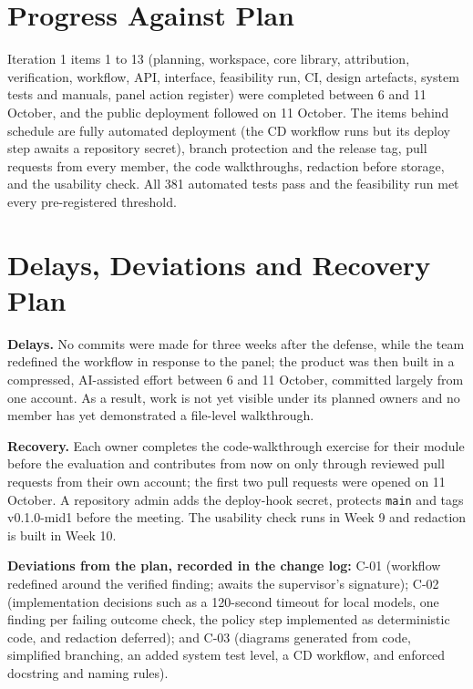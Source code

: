 \documentclass{fast-nuces-bs}
\begin{document}
\section{Progress Against Plan}

Iteration 1 items 1 to 13 (planning, workspace, core library, attribution, verification, workflow, API, interface, feasibility run, CI, design artefacts, system tests and manuals, panel action register) were completed between 6 and 11 October, and the public deployment followed on 11 October. The items behind schedule are fully automated deployment (the CD workflow runs but its deploy step awaits a repository secret), branch protection and the release tag, pull requests from every member, the code walkthroughs, redaction before storage, and the usability check. All 381 automated tests pass and the feasibility run met every pre-registered threshold.

\section{Delays, Deviations and Recovery Plan}

\textbf{Delays.} No commits were made for three weeks after the defense, while the team redefined the workflow in response to the panel; the product was then built in a compressed, AI-assisted effort between 6 and 11 October, committed largely from one account. As a result, work is not yet visible under its planned owners and no member has yet demonstrated a file-level walkthrough.

\textbf{Recovery.} Each owner completes the code-walkthrough exercise for their module before the evaluation and contributes from now on only through reviewed pull requests from their own account; the first two pull requests were opened on 11 October. A repository admin adds the deploy-hook secret, protects \texttt{main} and tags v0.1.0-mid1 before the meeting. The usability check runs in Week 9 and redaction is built in Week 10.

\textbf{Deviations from the plan, recorded in the change log:} C-01 (workflow redefined around the verified finding; awaits the supervisor's signature); C-02 (implementation decisions such as a 120-second timeout for local models, one finding per failing outcome check, the policy step implemented as deterministic code, and redaction deferred); and C-03 (diagrams generated from code, simplified branching, an added system test level, a CD workflow, and enforced docstring and naming rules).
\end{document}
